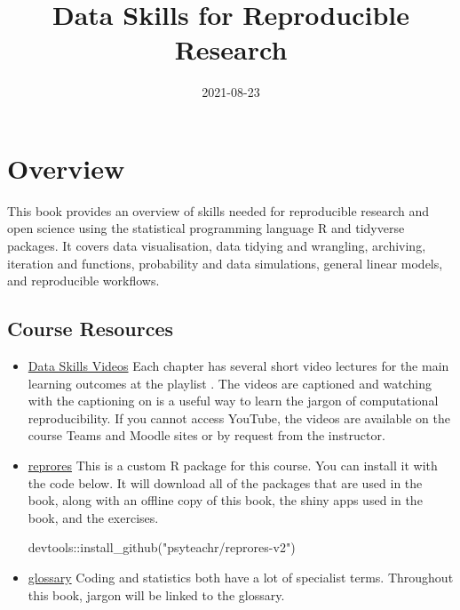 \documentclass[
  oneside]{book}
\title{Data Skills for Reproducible Research}
\author{}
\date{\vspace{-2.5em}2021-08-23}
\newenvironment{Shaded}{\begin{snugshade}}{\end{snugshade}}
\newcommand{\FunctionTok}[1]{\textcolor[rgb]{0.00,0.00,0.00}{#1}}
\newcommand{\NormalTok}[1]{#1}
\newcommand{\SpecialCharTok}[1]{\textcolor[rgb]{0.00,0.00,0.00}{#1}}
\newcommand{\StringTok}[1]{\textcolor[rgb]{0.31,0.60,0.02}{#1}}
\begin{document}
\maketitle

{
\setcounter{tocdepth}{1}
\tableofcontents
}
\hypertarget{overview}{%
\chapter*{Overview}\label{overview}}

This book provides an overview of skills needed for reproducible research and open science using the statistical programming language R and tidyverse packages. It covers data visualisation, data tidying and wrangling, archiving, iteration and functions, probability and data simulations, general linear models, and reproducible workflows.

\hypertarget{course-resources}{%
\section*{Course Resources}\label{course-resources}}

\begin{itemize}
\item
  \href{https://www.youtube.com/playlist?list=PLA2iRWVwbpTIweEBHD2dOKjZHK1atRmXt}{Data Skills Videos}
  Each chapter has several short video lectures for the main learning outcomes at the playlist . The videos are captioned and watching with the captioning on is a useful way to learn the jargon of computational reproducibility. If you cannot access YouTube, the videos are available on the course Teams and Moodle sites or by request from the instructor.
\item
  \href{https://github.com/psyteachr/reprores-v2}{reprores}
  This is a custom R package for this course. You can install it with the code below. It will download all of the packages that are used in the book, along with an offline copy of this book, the shiny apps used in the book, and the exercises.

\begin{Shaded}
\begin{Highlighting}[]
\NormalTok{devtools}\SpecialCharTok{::}\FunctionTok{install\_github}\NormalTok{(}\StringTok{"psyteachr/reprores{-}v2"}\NormalTok{)}
\end{Highlighting}
\end{Shaded}
\item
  \href{https://psyteachr.github.io/glossary}{glossary}
  Coding and statistics both have a lot of specialist terms. Throughout this book, jargon will be linked to the glossary.
\end{itemize}
\end{document}
